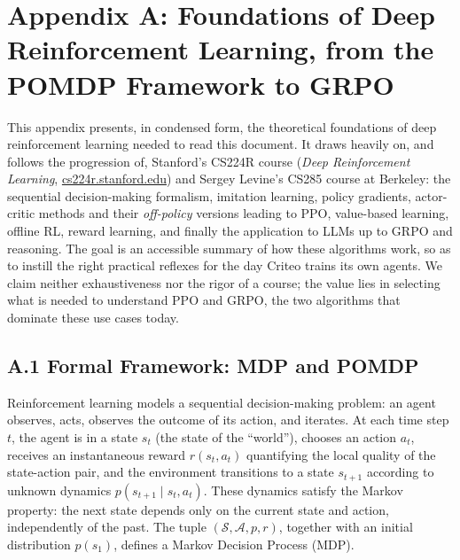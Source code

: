 \documentclass[11pt,a4paper]{article}
\begin{document}
\appendix



\newpage
\section{Appendix A: Foundations of Deep Reinforcement Learning, from the POMDP Framework to GRPO}
\label{annexe:maths_rl}

This appendix presents, in condensed form, the theoretical foundations of deep reinforcement learning needed to read this document. It draws heavily on, and follows the progression of, Stanford's CS224R course (\emph{Deep Reinforcement Learning}, \href{https://cs224r.stanford.edu/}{cs224r.stanford.edu}) and Sergey Levine's CS285 course at Berkeley: the sequential decision-making formalism, imitation learning, policy gradients, actor-critic methods and their \emph{off-policy} versions leading to PPO, value-based learning, offline RL, reward learning, and finally the application to LLMs up to GRPO and reasoning. The goal is an accessible summary of how these algorithms work, so as to instill the right practical reflexes for the day Criteo trains its own agents. We claim neither exhaustiveness nor the rigor of a course; the value lies in selecting what is needed to understand PPO and GRPO, the two algorithms that dominate these use cases today.


\subsection*{A.1 Formal Framework: MDP and POMDP}
Reinforcement learning models a sequential decision-making problem: an agent observes, acts, observes the outcome of its action, and iterates. At each time step $t$, the agent is in a state $s_t$ (the state of the ``world''), chooses an action $a_t$, receives an instantaneous reward $r(s_t, a_t)$ quantifying the local quality of the state-action pair, and the environment transitions to a state $s_{t+1}$ according to unknown dynamics $p(s_{t+1} \mid s_t, a_t)$. These dynamics satisfy the Markov property: the next state depends only on the current state and action, independently of the past. The tuple $(\mathcal{S}, \mathcal{A}, p, r)$, together with an initial distribution $p(s_1)$, defines a Markov Decision Process (MDP).
\end{document}
